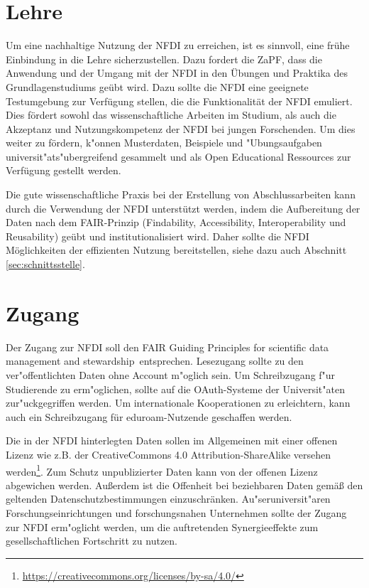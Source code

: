 \documentclass[DIV=calc]{scrartcl}
\begin{document}
\section{Lehre}
Um eine nachhaltige Nutzung der NFDI zu erreichen, ist es sinnvoll, eine frühe Einbindung in die Lehre sicherzustellen. 
Dazu fordert die ZaPF, dass die Anwendung und der Umgang mit der NFDI in den Übungen und Praktika des Grundlagenstudiums geübt wird. 
Dazu sollte die NFDI eine geeignete Testumgebung zur Verfügung stellen, die die Funktionalität der NFDI emuliert.
Dies fördert sowohl das wissenschaftliche Arbeiten im Studium, als auch die Akzeptanz und Nutzungskompetenz der NFDI bei jungen Forschenden. 
Um dies weiter zu fördern, k"onnen Musterdaten, Beispiele und "Ubungsaufgaben universit"ats"ubergreifend gesammelt und als Open Educational Ressources zur Verfügung gestellt werden.

Die gute wissenschaftliche Praxis bei der Erstellung von Abschlussarbeiten kann durch die Verwendung der NFDI unterstützt werden, indem die Aufbereitung der Daten nach dem FAIR-Prinzip (Findability, Accessibility, Interoperability und Reusability)\footnotemark{} geübt und institutionalisiert wird. 
Daher sollte die NFDI Möglichkeiten der effizienten Nutzung bereitstellen, siehe dazu auch Abschnitt \ref{sec:schnittsstelle}. 

\section{Zugang}
\label{sec:zugang}

Der Zugang zur NFDI soll den \glqq FAIR Guiding Principles for scientific data management and stewardship\grqq\ entsprechen\footnotemark[1].  
Lesezugang sollte zu den ver"offentlichten Daten ohne Account m"oglich sein. 
Um Schreibzugang f"ur Studierende zu erm"oglichen, sollte auf die OAuth-Systeme der Universit"aten zur"uckgegriffen werden. 
Um internationale Kooperationen zu erleichtern, kann auch ein Schreibzugang für eduroam-Nutzende geschaffen werden.

Die in der NFDI hinterlegten Daten sollen im Allgemeinen mit einer offenen Lizenz wie z.B. der CreativeCommons 4.0 Attribution-ShareAlike versehen werden\footnote{\url{https://creativecommons.org/licenses/by-sa/4.0/}}. Zum Schutz unpublizierter Daten kann von der offenen Lizenz abgewichen werden. Außerdem ist die Offenheit bei beziehbaren Daten gemäß den geltenden Datenschutzbestimmungen einzuschränken. Au"seruniversit"aren Forschungseinrichtungen und forschungsnahen Unternehmen sollte der Zugang zur NFDI erm"oglicht werden, um die auftretenden Synergieeffekte zum gesellschaftlichen Fortschritt zu nutzen.
\end{document}

